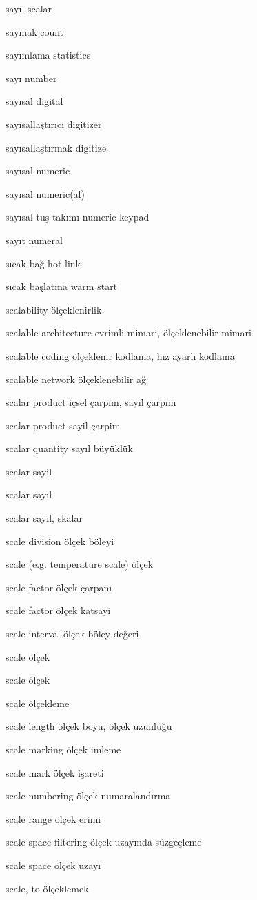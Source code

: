 \documentclass[12pt,fleqn]{article}\usepackage{../../common}
\begin{document}
sayıl scalar

saymak count

sayımlama statistics

sayı number

sayısal digital

sayısallaştırıcı digitizer

sayısallaştırmak digitize

sayısal numeric

sayısal numeric(al)

sayısal tuş takımı numeric keypad

sayıt numeral

sıcak bağ hot link

sıcak başlatma warm start

scalability ölçeklenirlik

scalable architecture evrimli mimari, ölçeklenebilir mimari

scalable coding ölçeklenir kodlama, hız ayarlı kodlama

scalable network ölçeklenebilir ağ

scalar product içsel çarpım, sayıl çarpım

scalar product sayil çarpim

scalar quantity sayıl büyüklük

scalar sayil

scalar sayıl

scalar sayıl, skalar

scale division ölçek böleyi

scale (e.g. temperature scale) ölçek

scale factor ölçek çarpanı

scale factor ölçek katsayi

scale interval ölçek böley değeri

scale ölçek

scale ölçek

scale ölçekleme

scale length ölçek boyu, ölçek uzunluğu

scale marking ölçek imleme

scale mark ölçek işareti

scale numbering ölçek numaralandırma

scale range ölçek erimi

scale space filtering ölçek uzayında süzgeçleme

scale space ölçek uzayı

scale, to ölçeklemek
\end{document}
